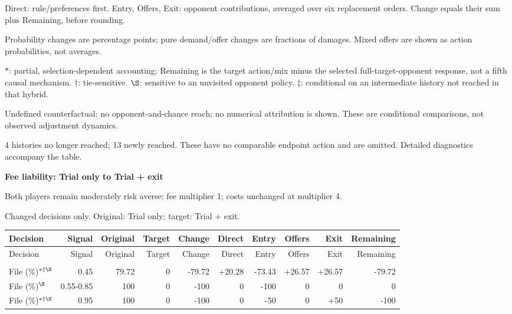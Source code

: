 \documentclass[10pt]{article}
\begin{document}
{\footnotesize Direct: rule/preferences first. Entry, Offers, Exit: opponent contributions, averaged over six replacement orders. Change equals their sum plus Remaining, before rounding.\par
Probability changes are percentage points; pure demand/offer changes are fractions of damages. Mixed offers are shown as action probabilities, not averages.\par
$*$: partial, selection-dependent accounting; Remaining is the target action/mix minus the selected full-target-opponent response, not a fifth causal mechanism. $\dagger$: tie-sensitive. $\S$: sensitive to an unvisited opponent policy. $\ddagger$: conditional on an intermediate history not reached in that hybrid.\par
Undefined counterfactual: no opponent-and-chance reach; no numerical attribution is shown. These are conditional comparisons, not observed adjustment dynamics.\par
4 histories no longer reached; 13 newly reached. These have no comparable endpoint action and are omitted. Detailed diagnostics accompany the table.}\par
\clearpage
{\large\bfseries Fee liability: Trial only to Trial + exit}\par
Both players remain moderately risk averse; fee multiplier 1; costs unchanged at multiplier 4.\par
{\small Changed decisions only. Original: Trial only; target: Trial + exit.}\par
{\small\setlength{\tabcolsep}{3pt}\begin{longtable}{@{}>{\raggedright\arraybackslash}p{1.65in}rrrrrrrrr@{}}
\toprule Decision & Signal & Original & Target & Change & Direct & Entry & Offers & Exit & Remaining \\\midrule\endfirsthead
\toprule Decision & Signal & Original & Target & Change & Direct & Entry & Offers & Exit & Remaining \\\midrule\endhead
\bottomrule\endfoot
\multicolumn{10}{@{}l}{\textbf{Plaintiff}}\\
File (\%)$^{*\dagger\S}$ & 0.45 & 79.72 & 0 & -79.72 & +20.28 & -73.43 & +26.57 & +26.57 & -79.72\\
File (\%)$^{\S}$ & 0.55-0.85 & 100 & 0 & -100 & 0 & -100 & 0 & 0 & 0\\
File (\%)$^{*\dagger\S}$ & 0.95 & 100 & 0 & -100 & 0 & -50 & 0 & +50 & -100\\
\end{longtable}}
\end{document}
